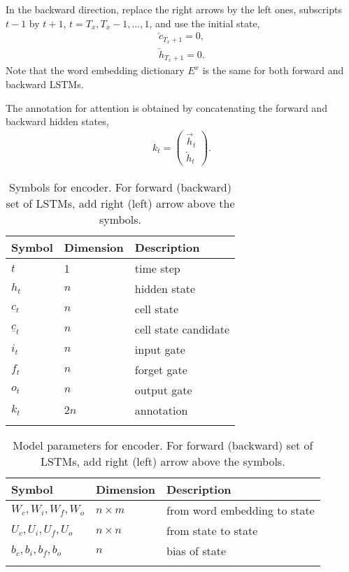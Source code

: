 \documentclass{article}
\begin{document}
	In the backward direction, replace the right arrows by the left ones, subscripts $t - 1$ by $t + 1$, $t = T_x, T_x - 1, \dots, 1$, and use the initial state,
		\begin{align}
			\overleftarrow{c}_{T_x + 1} = 0, \\
			\overleftarrow{h}_{T_x + 1} = 0.
		\end{align}
		Note that the word embedding dictionary $E^x$ is the same for both forward and backward LSTMs.
	
	The annotation for attention is obtained by concatenating the forward and backward hidden states,
		\begin{align}
			k_t = \left(\begin{array}{cc}
				\overrightarrow{h}_t \\
				\overleftarrow{h}_t
			\end{array}\right).
		\end{align}


\begin{table}[!htb]
\centering
\begin{tabular}{lll}
\toprule
Symbol & Dimension & Description \\
\midrule
$t$ & 1 & time step \\
$h_t$ & $n$ & hidden state \\
$c_t$ & $n$ & cell state \\
$\underline{c}_t$ & $n$ & cell state candidate \\
$i_t$ & $n$ & input gate \\
$f_t$ & $n$ & forget gate \\
$o_t$ & $n$ & output gate \\
$k_t$ & $2 n$ & annotation \\
\bottomrule \\
\end{tabular}
\caption{Symbols for encoder. For forward (backward) set of LSTMs, add right (left) arrow above the symbols.}
\label{tab:EncoderSymbol}
\end{table}


\begin{table}[!htb]
\centering
\begin{tabular}{lll}
\toprule
Symbol & Dimension & Description \\
\midrule
$W_c, W_i, W_f, W_o$ & $n \times m$ & from word embedding to state \\
$U_c, U_i, U_f, U_o$ & $n \times n$ & from state to state \\
$b_c, b_i, b_f, b_o$ & $n$ & bias of state \\
\bottomrule \\
\end{tabular}
\caption{Model parameters for encoder. For forward (backward) set of LSTMs, add right (left) arrow above the symbols.}
\label{tab:EncoderModel}
\end{table}
\end{document}
